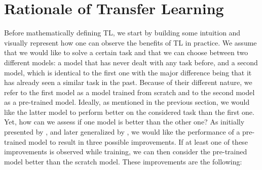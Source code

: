 \section{Rationale of Transfer Learning}
\label{sec:rationale}

Before mathematically defining TL, we start by building some intuition and visually represent how one can observe the benefits of TL in practice. We assume that we would like to solve a certain task and that we can choose between two different models: a model that has never dealt with any task before, and a second model, which is identical to the first one with the major difference being that it has already seen a similar task in the past. Because of their different nature, we refer to the first model as a model trained from scratch and to the second model as a pre-trained model. Ideally, as mentioned in the previous section, we would like the latter model to perform better on the considered task than the first one. Yet, how can we assess if one model is better than the other one? As initially presented by \citet{langley2006transfer}, and later generalized by \citet{lazaric2012transfer}, we would like the performance of a pre-trained model to result in three possible improvements. If at least one of these improvements is observed while training, we can then consider the pre-trained model better than the scratch model. These improvements are the following:
